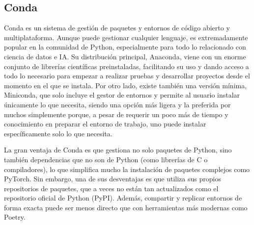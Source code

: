 \subsection{Conda}


Conda es un sistema de gestión de paquetes y entornos de código abierto y multiplataforma. Aunque puede gestionar cualquier lenguaje, es extremadamente popular en la comunidad de Python, especialmente para todo lo relacionado con ciencia de datos e IA. Su distribución principal, Anaconda, viene con un enorme conjunto de librerías científicas preinstaladas, facilitando su uso y dando acceso a todo lo necesario para empezar a realizar pruebas y desarrollar proyectos desde el momento en el que se instala. Por otro lado, existe también una versión mínima, Miniconda, que solo incluye el gestor de entornos y permite al usuario instalar únicamente lo que necesita, siendo una opción más ligera y la preferida por muchos simplemente porque, a pesar de requerir un poco más de tiempo y conocimiento en preparar el entorno de trabajo, uno puede instalar específicamente solo lo que necesita.

La gran ventaja de Conda es que gestiona no solo paquetes de Python, sino también dependencias que no son de Python (como librerías de C o compiladores), lo que simplifica mucho la instalación de paquetes complejos como PyTorch. Sin embargo, una de sus desventajas es que utiliza sus propios repositorios de paquetes, que a veces no están tan actualizados como el repositorio oficial de Python (PyPI). Además, compartir y replicar entornos de forma exacta puede ser menos directo que con herramientas más modernas como Poetry.

